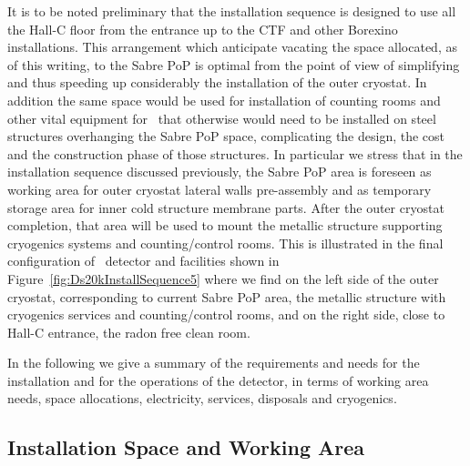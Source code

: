 It is to be noted preliminary that the installation sequence is designed to use all the Hall-C floor from the entrance up to the CTF and other Borexino installations. This arrangement which anticipate vacating the space allocated, as of this writing, to the Sabre PoP is optimal from the point of view of simplifying and thus speeding up considerably the installation of the outer cryostat. In addition the same space would be used for installation of counting rooms and other vital equipment for 
\DSk\ that otherwise would need to be installed on steel structures overhanging the Sabre PoP space, complicating the design, the cost and the construction phase of those structures.
In particular we stress that in the installation sequence discussed previously, the Sabre PoP area is foreseen as working area for outer cryostat lateral walls pre-assembly and as temporary storage area for inner cold structure membrane parts. After the outer cryostat completion, that area will be used to mount the metallic structure supporting cryogenics systems and counting/control rooms. This is illustrated in the final configuration of \DSk\ detector and facilities shown in Figure~\ref{fig:Ds20kInstallSequence5} where we find on the left side of the outer cryostat, corresponding to current Sabre PoP area, the metallic structure with cryogenics services and counting/control rooms, and on the right side, close to Hall-C entrance, the radon free clean room. 

\vspace{1cm}

In the following we give a summary of the requirements and needs for the installation and for the operations of the \DSk detector, in terms of working area needs, space allocations, electricity, services, disposals and cryogenics.

\subsection{Installation Space and Working Area}
\label{sec:SpaceAndService}

